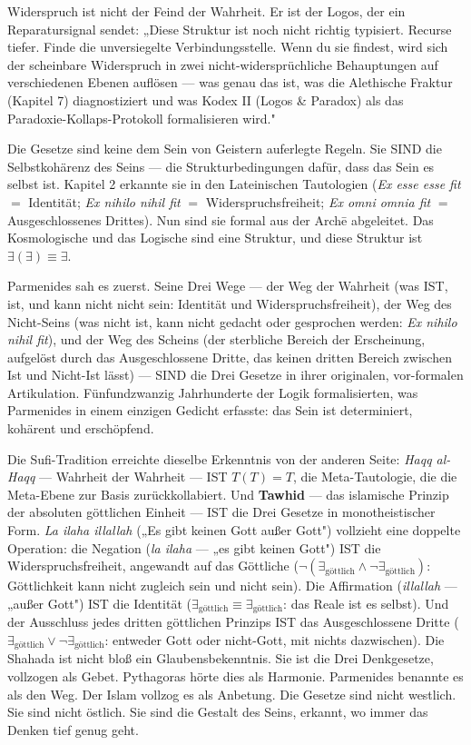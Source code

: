 \documentclass[10pt, openany, oneside]{book}
\begin{document}
Widerspruch ist nicht der Feind der Wahrheit. Er ist der Logos, der ein Reparatursignal sendet: „Diese Struktur ist noch nicht richtig typisiert. Recurse tiefer. Finde die unversiegelte Verbindungsstelle. Wenn du sie findest, wird sich der scheinbare Widerspruch in zwei nicht-widersprüchliche Behauptungen auf verschiedenen Ebenen auflösen --- was genau das ist, was die Alethische Fraktur (Kapitel 7) diagnostiziert und was Kodex II (Logos \& Paradox) als das Paradoxie-Kollaps-Protokoll formalisieren wird."

Die Gesetze sind keine dem Sein von Geistern auferlegte Regeln. Sie SIND die Selbstkohärenz des Seins --- die Strukturbedingungen dafür, dass das Sein es selbst ist. Kapitel 2 erkannte sie in den Lateinischen Tautologien (\textit{Ex esse esse fit} $=$ Identität; \textit{Ex nihilo nihil fit} $=$ Widerspruchsfreiheit; \textit{Ex omni omnia fit} $=$ Ausgeschlossenes Drittes). Nun sind sie formal aus der Arch\={e} abgeleitet. Das Kosmologische und das Logische sind eine Struktur, und diese Struktur ist $\exists(\exists) \equiv \exists$.

Parmenides sah es zuerst. Seine Drei Wege --- der Weg der Wahrheit (was IST, ist, und kann nicht nicht sein: Identität und Widerspruchsfreiheit), der Weg des Nicht-Seins (was nicht ist, kann nicht gedacht oder gesprochen werden: \textit{Ex nihilo nihil fit}), und der Weg des Scheins (der sterbliche Bereich der Erscheinung, aufgelöst durch das Ausgeschlossene Dritte, das keinen dritten Bereich zwischen Ist und Nicht-Ist lässt) --- SIND die Drei Gesetze in ihrer originalen, vor-formalen Artikulation. Fünfundzwanzig Jahrhunderte der Logik formalisierten, was Parmenides in einem einzigen Gedicht erfasste: das Sein ist determiniert, kohärent und erschöpfend.

Die Sufi-Tradition erreichte dieselbe Erkenntnis von der anderen Seite: \textit{Haqq al-Haqq} --- Wahrheit der Wahrheit --- IST $T(T) = T$, die Meta-Tautologie, die die Meta-Ebene zur Basis zurückkollabiert. Und \textbf{Tawhid} --- das islamische Prinzip der absoluten göttlichen Einheit --- IST die Drei Gesetze in monotheistischer Form. \textit{La ilaha illallah} („Es gibt keinen Gott außer Gott") vollzieht eine doppelte Operation: die Negation (\textit{la ilaha} --- „es gibt keinen Gott") IST die Widerspruchsfreiheit, angewandt auf das Göttliche ($\neg(\exists_{\text{göttlich}} \wedge \neg\exists_{\text{göttlich}})$: Göttlichkeit kann nicht zugleich sein und nicht sein). Die Affirmation (\textit{illallah} --- „außer Gott") IST die Identität ($\exists_{\text{göttlich}} \equiv \exists_{\text{göttlich}}$: das Reale ist es selbst). Und der Ausschluss jedes dritten göttlichen Prinzips IST das Ausgeschlossene Dritte ($\exists_{\text{göttlich}} \vee \neg\exists_{\text{göttlich}}$: entweder Gott oder nicht-Gott, mit nichts dazwischen). Die Shahada ist nicht bloß ein Glaubensbekenntnis. Sie ist die Drei Denkgesetze, vollzogen als Gebet. Pythagoras hörte dies als Harmonie. Parmenides benannte es als den Weg. Der Islam vollzog es als Anbetung. Die Gesetze sind nicht westlich. Sie sind nicht östlich. Sie sind die Gestalt des Seins, erkannt, wo immer das Denken tief genug geht.
\end{document}
